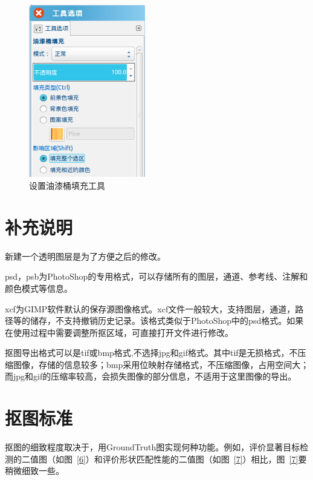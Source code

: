 \documentclass[12pt]{article}
\begin{document}
\begin{figure}[htbp]
\centering
\includegraphics[width=2in]{tianchong1.png}
\caption{设置油漆桶填充工具}
\label{5}
\end{figure}



\section{补充说明}

\begin{itemize*}
\item 新建一个透明图层是为了方便之后的修改。

\item psd，psb为PhotoShop的专用格式，可以存储所有的图层，通道、参考线、注解和颜色模式等信息。

\item xcf为GIMP软件默认的保存源图像格式。xcf文件一般较大，支持图层，通道，路径等的储存，不支持撤销历史记录。该格式类似于PhotoShop中的psd格式。如果在使用过程中需要调整所抠区域，可直接打开文件进行修改。

\item 抠图导出格式可以是tif或bmp格式,不选择jpg和gif格式。其中tif是无损格式，不压缩图像，存储的信息较多；bmp采用位映射存储格式，不压缩图像，占用空间大；而jpg和gif的压缩率较高，会损失图像的部分信息，不适用于这里图像的导出。
\end{itemize*}

\section{抠图标准}
\hspace{0.3in}抠图的细致程度取决于，用GroundTruth图实现何种功能。例如，评价显著目标检测的二值图（如图~\ref{6}）和评价形状匹配性能的二值图（如图~\ref{7}）相比，图~\ref{7}要稍微细致一些。
\end{document}
